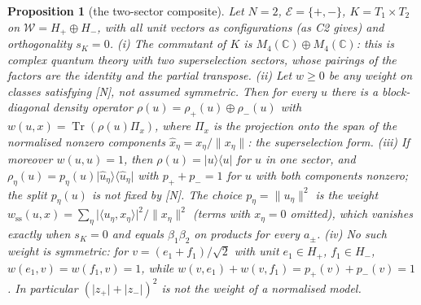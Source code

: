 \documentclass[aps,pra,onecolumn,superscriptaddress,nofootinbib,10pt]{revtex4-2}
\newtheorem{proposition}[theorem]{Proposition}
\theoremstyle{definition}
\theoremstyle{remark}
\newcommand{\C}{\mathbb{C}}
\newcommand{\tr}{\operatorname{Tr}}
\newcommand{\ip}[2]{\langle #1,#2\rangle}
\begin{document}
\begin{proposition}[the two-sector composite]\label{prop:superselection}
Let $N=2$, $\mathcal E=\{+,-\}$, $K=T_1\times T_2$ on $\mathcal W=H_+\oplus H_-$, with all unit vectors as configurations
(as C2 gives) and orthogonality $s_K=0$.
(i) The commutant of $K$ is $M_4(\C)\oplus M_4(\C)$: this is complex quantum theory with two superselection
sectors, whose pairings of the factors are the identity and the partial transpose.
(ii) Let $w\ge0$ be any weight on classes satisfying [N], not assumed symmetric.  Then for every $u$ there is a
block-diagonal density operator $\rho(u)=\rho_+(u)\oplus\rho_-(u)$ with $w(u,x)=\tr(\rho(u)\Pi_x)$, where $\Pi_x$ is the
projection onto the span of the normalised nonzero components $\hat x_\eta=x_\eta/\lVert x_\eta\rVert$: the superselection form.
(iii) If moreover $w(u,u)=1$, then $\rho(u)=\lvert u\rangle\langle u\rvert$ for $u$ in one sector, and
$\rho_\eta(u)=p_\eta(u)\lvert\hat u_\eta\rangle\langle\hat u_\eta\rvert$ with $p_++p_-=1$ for $u$ with both components nonzero; the split $p_\eta(u)$
is not fixed by [N].  The choice $p_\eta=\lVert u_\eta\rVert^2$ is the weight
$w_{\mathrm{ss}}(u,x)=\sum_\eta\lvert\ip{u_\eta}{x_\eta}\rvert^2/\lVert x_\eta\rVert^2$ (terms with $x_\eta=0$ omitted), which vanishes exactly when
$s_K=0$ and equals $\beta_1\beta_2$ on products for every $a_\pm$.
(iv) No such weight is symmetric: for $v=(e_1+f_1)/\sqrt2$ with unit $e_1\in H_+$, $f_1\in H_-$,
$w(e_1,v)=w(f_1,v)=1$, while $w(v,e_1)+w(v,f_1)=p_+(v)+p_-(v)=1$.  In particular
$(\lvert z_+\rvert+\lvert z_-\rvert)^2$ is not the weight of a normalised model.
\end{proposition}
\end{document}
